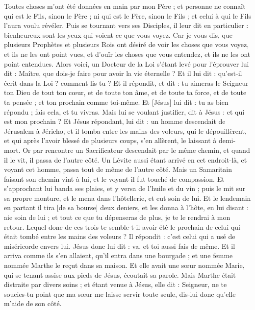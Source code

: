 \begin{multicols}{2}
Toutes choses m'ont été données en main par mon Père ; et personne ne connaît qui est le Fils, sinon le Père ; ni qui est le Père, sinon le Fils ; et celui à qui le Fils l'aura voulu révéler.
Puis se tournant vers ses Disciples, il leur dit en particulier : bienheureux sont les yeux qui voient ce que vous voyez.
Car je vous dis, que plusieurs Prophètes et plusieurs Rois ont désiré de voir les choses que vous voyez, et ils ne les ont point vues, et d'ouïr les choses que vous entendez, et ils ne les ont point entendues.
Alors voici, un Docteur de la Loi s'étant levé pour l'éprouver lui dit : Maître, que dois-je faire pour avoir la vie éternelle ?
Et il lui dit : qu'est-il écrit dans la Loi ? comment lis-tu ?
Et il répondit, et dit : tu aimeras le Seigneur ton Dieu de tout ton cœur, et de toute ton âme, et de toute ta force, et de toute ta pensée ; et ton prochain comme toi-même.
Et [Jésus] lui dit : tu as bien répondu ; fais cela, et tu vivras.
Mais lui se voulant justifier, dit à Jésus : et qui est mon prochain ?
Et Jésus répondant, lui dit : un homme descendait de Jérusalem à Jéricho, et il tomba entre les mains des voleurs, qui le dépouillèrent, et qui après l'avoir blessé de plusieurs coups, s'en allèrent, le laissant à demi-mort.
Or par rencontre un Sacrificateur descendait par le même chemin, et quand il le vit, il passa de l'autre côté.
Un Lévite aussi étant arrivé en cet endroit-là, et voyant cet homme, passa tout de même de l'autre côté.
Mais un Samaritain faisant son chemin vint à lui, et le voyant il fut touché de compassion.
Et s'approchant lui banda ses plaies, et y versa de l'huile et du vin ; puis le mit sur sa propre monture, et le mena dans l'hôtellerie, et eut soin de lui.
Et le lendemain en partant il tira [de sa bourse] deux deniers, et les donna à l'hôte, en lui disant : aie soin de lui ; et tout ce que tu dépenseras de plus, je te le rendrai à mon retour.
Lequel donc de ces trois te semble-t-il avoir été le prochain de celui qui était tombé entre les mains des voleurs ?
Il répondit : c'est celui qui a usé de miséricorde envers lui. Jésus donc lui dit : va, et toi aussi fais de même.
Et il arriva comme ils s'en allaient, qu'il entra dans une bourgade ; et une femme nommée Marthe le reçut dans sa maison.
Et elle avait une sœur nommée Marie, qui se tenant assise aux pieds de Jésus, écoutait sa parole.
Mais Marthe était distraite par divers soins ; et étant venue à Jésus, elle dit : Seigneur, ne te soucies-tu point que ma sœur me laisse servir toute seule, dis-lui donc qu'elle m'aide de son côté.

\end{multicols}
